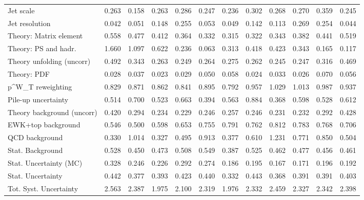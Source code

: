 \begin{tabular}{l|p{0.6cm}p{0.6cm}p{0.6cm}p{0.6cm}p{0.6cm}p{0.6cm}p{0.6cm}p{0.6cm}p{0.6cm}p{0.6cm}p{0.6cm}}
Jet scale                                & 0.263 & 0.158 & 0.263 & 0.286 & 0.247 & 0.236 & 0.302 & 0.268 & 0.270 & 0.359 & 0.245 \\
Jet resolution                           & 0.042 & 0.051 & 0.148 & 0.255 & 0.053 & 0.049 & 0.142 & 0.113 & 0.269 & 0.254 & 0.044 \\
Theory: Matrix element                   & 0.558 & 0.477 & 0.412 & 0.364 & 0.332 & 0.315 & 0.322 & 0.343 & 0.382 & 0.441 & 0.519 \\
Theory: PS and hadr.                     & 1.660 & 1.097 & 0.622 & 0.236 & 0.063 & 0.313 & 0.418 & 0.423 & 0.343 & 0.165 & 0.117 \\
Theory unfolding (uncorr)                & 0.492 & 0.343 & 0.263 & 0.249 & 0.264 & 0.275 & 0.262 & 0.245 & 0.247 & 0.316 & 0.469 \\
Theory: PDF                              & 0.028 & 0.037 & 0.023 & 0.029 & 0.050 & 0.058 & 0.024 & 0.033 & 0.026 & 0.070 & 0.056 \\
p^{W}_{T} reweighting                    & 0.829 & 0.871 & 0.862 & 0.841 & 0.895 & 0.792 & 0.957 & 1.029 & 1.013 & 0.987 & 0.937 \\
Pile-up uncertainty                      & 0.514 & 0.700 & 0.523 & 0.663 & 0.394 & 0.563 & 0.884 & 0.368 & 0.598 & 0.528 & 0.612 \\
Theory background (uncorr)               & 0.420 & 0.294 & 0.234 & 0.229 & 0.246 & 0.257 & 0.246 & 0.231 & 0.232 & 0.292 & 0.428 \\
EWK+top background                       & 0.546 & 0.500 & 0.598 & 0.653 & 0.755 & 0.791 & 0.762 & 0.812 & 0.783 & 0.768 & 0.706 \\
QCD background                           & 0.330 & 1.014 & 0.327 & 0.495 & 0.913 & 0.377 & 0.610 & 1.231 & 0.771 & 0.850 & 0.504 \\
Stat. Background                         & 0.528 & 0.450 & 0.473 & 0.508 & 0.549 & 0.387 & 0.525 & 0.462 & 0.477 & 0.456 & 0.461 \\
Stat. Uncertainty (MC)                   & 0.328 & 0.246 & 0.226 & 0.292 & 0.274 & 0.186 & 0.195 & 0.167 & 0.171 & 0.196 & 0.192 \\
\hline
Stat. Uncertainty                        & 0.442 & 0.377 & 0.393 & 0.423 & 0.440 & 0.332 & 0.443 & 0.368 & 0.391 & 0.391 & 0.403 \\
\hline
Tot. Syst. Uncertainty                   & 2.563 & 2.387 & 1.975 & 2.100 & 2.319 & 1.976 & 2.332 & 2.459 & 2.327 & 2.342 & 2.398 \\
\hline
\end{tabular}
